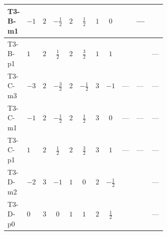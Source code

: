 \documentclass[8pt]{article}
\begin{document}
\begin{landscape}
\begin{longtable}{@{}llcccccc >{\raggedright\arraybackslash}p{0.21\linewidth} >{\raggedright\arraybackslash}p{0.21\linewidth} >{\raggedright\arraybackslash}p{0.21\linewidth}@{}}
\midrule
T3-B-m1 & $-1$ & $2$ & $-\frac{1}{2}$ & $2$ & $\frac{1}{2}$ & $1$ & $0$ & \scriptsize\adjustbox{max width=\linewidth}{$\begin{gathered} +T_{\nu}^{(1)} \left({y_1}\right)_{ij}\end{gathered}$} & --- & \scriptsize\adjustbox{max width=\linewidth}{$\begin{gathered} \operatorname{Tr}\!\left({y_1}\,\left({y_2}\right)^{\dagger}\right) \left({y_2}\right)_{ij}\end{gathered}$} \\
\midrule
T3-B-p1 & $1$ & $2$ & $\frac{1}{2}$ & $2$ & $\frac{3}{2}$ & $1$ & $1$ & \scriptsize\adjustbox{max width=\linewidth}{$\begin{gathered} T_{\nu}^{(1)} \left({y_1}\right)_{ij}\end{gathered}$} & \scriptsize\adjustbox{max width=\linewidth}{$\begin{gathered} +\frac{1}{2} (\left({y_2}\,\left({y_2}\right)^{\dagger}\,{y_1}\right)_{ij}+\left({Y_e}\,\left({Y_e}\right)^{\dagger}\,{y_1}\right)_{ij}+3 \left({y_1}\,\left({y_1}\right)^{\dagger}\,{y_1}\right)_{ij})\end{gathered}$} & --- \\
\midrule
T3-C-m3 & $-3$ & $2$ & $-\frac{3}{2}$ & $2$ & $-\frac{1}{2}$ & $3$ & $-1$ & --- & --- & --- \\
\midrule
T3-C-m1 & $-1$ & $2$ & $-\frac{1}{2}$ & $2$ & $\frac{1}{2}$ & $3$ & $0$ & --- & --- & --- \\
\midrule
T3-C-p1 & $1$ & $2$ & $\frac{1}{2}$ & $2$ & $\frac{3}{2}$ & $3$ & $1$ & --- & --- & --- \\
\midrule
T3-D-m2 & $-2$ & $3$ & $-1$ & $1$ & $0$ & $2$ & $-\frac{1}{2}$ & \scriptsize\adjustbox{max width=\linewidth}{$\begin{gathered} T_{\nu}^{(1)} \left({y_1}\right)_{ij}\end{gathered}$} & \scriptsize\adjustbox{max width=\linewidth}{$\begin{gathered} +\frac{1}{2} (\left({y_2}\,\left({y_2}\right)^{\dagger}\,{y_1}\right)_{ij}+\left({Y_e}\,\left({Y_e}\right)^{\dagger}\,{y_1}\right)_{ij}+3 \left({y_1}\,\left({y_1}\right)^{\dagger}\,{y_1}\right)_{ij})\end{gathered}$} & --- \\
\midrule
T3-D-p0 & $0$ & $3$ & $0$ & $1$ & $1$ & $2$ & $\frac{1}{2}$ & \scriptsize\adjustbox{max width=\linewidth}{$\begin{gathered} T_{\nu}^{(1)} \left({y_1}\right)_{ij}\end{gathered}$} & \scriptsize\adjustbox{max width=\linewidth}{$\begin{gathered} +\frac{1}{2} (\left({y_2}\,\left({y_2}\right)^{\dagger}\,{y_1}\right)_{ij}+\left({Y_e}\,\left({Y_e}\right)^{\dagger}\,{y_1}\right)_{ij}+3 \left({y_1}\,\left({y_1}\right)^{\dagger}\,{y_1}\right)_{ij})\end{gathered}$} & --- \\

\end{longtable}
\end{landscape}
\end{document}
